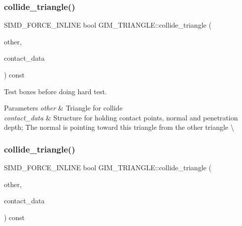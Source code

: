 \subsubsection{\texorpdfstring{collide\+\_\+triangle()}{collide\_triangle()}\hspace{0.1cm}{\footnotesize\ttfamily [1/2]}}
{\footnotesize\ttfamily S\+I\+M\+D\+\_\+\+F\+O\+R\+C\+E\+\_\+\+I\+N\+L\+I\+NE bool G\+I\+M\+\_\+\+T\+R\+I\+A\+N\+G\+L\+E\+::collide\+\_\+triangle (\begin{DoxyParamCaption}\item[{const \hyperlink{classGIM__TRIANGLE}{G\+I\+M\+\_\+\+T\+R\+I\+A\+N\+G\+LE} \&}]{other,  }\item[{\hyperlink{structGIM__TRIANGLE__CONTACT__DATA}{G\+I\+M\+\_\+\+T\+R\+I\+A\+N\+G\+L\+E\+\_\+\+C\+O\+N\+T\+A\+C\+T\+\_\+\+D\+A\+TA} \&}]{contact\+\_\+data }\end{DoxyParamCaption}) const\hspace{0.3cm}{\ttfamily [inline]}}



Test boxes before doing hard test. 


\begin{DoxyParams}{Parameters}
{\em other} & Triangle for collide \\
\hline
{\em contact\+\_\+data} & Structure for holding contact points, normal and penetration depth; The normal is pointing toward this triangle from the other triangle \textbackslash{} \\
\hline
\end{DoxyParams}
\mbox{\label{classGIM__TRIANGLE_ac8930de461fb35af599d7a28d0a02229}} 
\subsubsection{\texorpdfstring{collide\+\_\+triangle()}{collide\_triangle()}\hspace{0.1cm}{\footnotesize\ttfamily [2/2]}}
{\footnotesize\ttfamily S\+I\+M\+D\+\_\+\+F\+O\+R\+C\+E\+\_\+\+I\+N\+L\+I\+NE bool G\+I\+M\+\_\+\+T\+R\+I\+A\+N\+G\+L\+E\+::collide\+\_\+triangle (\begin{DoxyParamCaption}\item[{const \hyperlink{classGIM__TRIANGLE}{G\+I\+M\+\_\+\+T\+R\+I\+A\+N\+G\+LE} \&}]{other,  }\item[{\hyperlink{structGIM__TRIANGLE__CONTACT__DATA}{G\+I\+M\+\_\+\+T\+R\+I\+A\+N\+G\+L\+E\+\_\+\+C\+O\+N\+T\+A\+C\+T\+\_\+\+D\+A\+TA} \&}]{contact\+\_\+data }\end{DoxyParamCaption}) const\hspace{0.3cm}{\ttfamily [inline]}}



